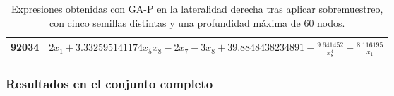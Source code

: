 \begin{table}[H]
{\begin{tabular}{|c|c|}
92034            & $2 x_{1} + 3.332595141174 x_{5} x_{8} - 2 x_{7} - 3 x_{8} + 39.8848438234891 - \frac{9.641452}{x_{8}^{4}} - \frac{8.116195}{x_{1}}$                                                                                                                                                                                                                                            \\ \hline
\end{tabular}%
}
\caption{Expresiones obtenidas con GA-P en la lateralidad derecha tras aplicar sobremuestreo, con cinco semillas distintas y una profundidad máxima de 60 nodos.}\label{table:exp_GAP_over_l1_60}
\end{table}



\subsubsection{Resultados en el conjunto completo}

\begin{table}[H]
\centering
{}
\caption{Resultados de GA-P en el conjunto de datos tras aplicar sobremuestreo, con cinco semillas distintas y una profundidad máxima de 20 nodos.}\label{table:resultados_GAP_over_c_20}
\end{table}


